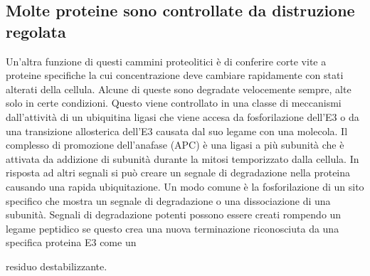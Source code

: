 \subsection{Molte proteine sono controllate da distruzione regolata}
Un'altra funzione di questi cammini proteolitici \`e di conferire corte vite a proteine specifiche la cui concentrazione deve cambiare rapidamente con stati alterati della cellula. 
Alcune di queste sono degradate velocemente sempre, alte solo in certe condizioni. Questo viene controllato in una classe di meccanismi dall'attivit\`a di un ubiquitina ligasi che viene
accesa da fosforilazione dell'E3 o da una transizione allosterica dell'E3 causata dal suo legame con una molecola. Il complesso di promozione dell'anafase (APC) \`e una ligasi a pi\`u
subunit\`a che \`e attivata da addizione di subunit\`a durante la mitosi temporizzato dalla cellula. In risposta ad altri segnali si pu\`o creare un segnale di degradazione nella 
proteina causando una rapida ubiquitazione. Un modo comune \`e la fosforilazione di un  sito specifico che mostra un segnale di degradazione o una dissociazione di una subunit\`a. 
Segnali di degradazione potenti possono essere creati rompendo un legame peptidico se questo crea una nuova terminazione  riconosciuta da una specifica proteina E3 come un

residuo destabilizzante. 
